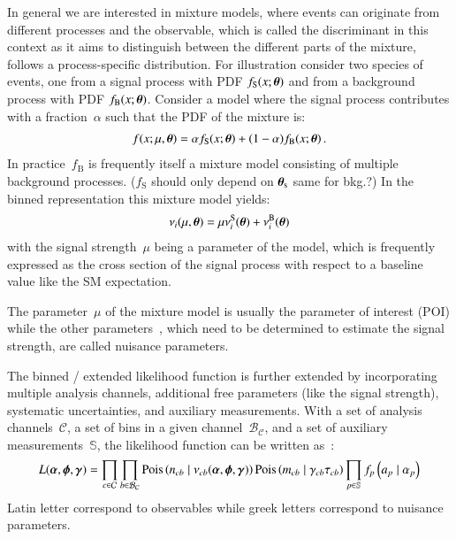 
In general we are interested in mixture models, where events can
originate from different processes and the observable, which is called
the discriminant in this context as it aims to distinguish between the
different parts of the mixture, follows a process-specific
distribution. For illustration consider two species of events, one
from a signal process with PDF $f_\text{S}(x; \boldtheta)$ and from a
background process with PDF $f_\text{B}(x; \boldtheta)$. Consider a
model where the signal process contributes with a fraction~$\alpha$
such that the PDF of the mixture is:
\begin{align*}
  f(x; \mu, \boldtheta) = \alpha f_\text{S}(x; \boldtheta) + (1 - \alpha) f_\text{B}(x; \boldtheta) \,\text{.}
\end{align*}
In practice~$f_\text{B}$ is frequently itself a mixture model
consisting of multiple background processes. ($f_\text{S}$ should only
depend on $\boldtheta_\text{s}$ same for bkg.?) In the binned representation this
mixture model yields:
\begin{align*}
  \nu_i(\mu, \boldtheta) = \mu \nu_i^\text{S}(\boldtheta) + \nu_i^\text{B}(\boldtheta)
\end{align*}
with the signal strength~$\mu$ being a parameter of the model, which
is frequently expressed as the cross section of the signal process
with respect to a baseline value like the SM expectation.

The parameter~$\mu$ of the mixture model is usually the parameter of
interest (POI) while the other parameters~\boldtheta, which need to be
determined to estimate the signal strength, are called nuisance
parameters.


The binned / extended likelihood function is further extended by
incorporating multiple analysis channels, additional free parameters
(like the signal strength), systematic uncertainties, and auxiliary
measurements. With a set of analysis channels~$\mathcal{C}$, a set of
bins in a given channel~$\mathcal{B}_\mathcal{C}$, and a set of
auxiliary measurements~$\mathbb{S}$, the likelihood function can be
written as~\cite{cranmer2012}:
\begin{align*}
  L(\boldalpha, \boldphi, \boldgamma) =
  \prod_{c \in \mathcal{C}} \prod_{b \in \mathcal{B}_{\mathcal{C}}}
  \mathrm{Pois}\left( n_{cb} \mid \nu_{cb}(\boldalpha, \boldphi, \boldgamma) \right)
  \mathrm{Pois}\left(m_{cb} \mid  \gamma_{cb} \tau_{cb} \right)
  \prod_{p \in \mathbb{S}} f_p\left(a_p \mid \alpha_p \right)
\end{align*}
Latin letter correspond to observables while greek letters correspond
to nuisance parameters.

